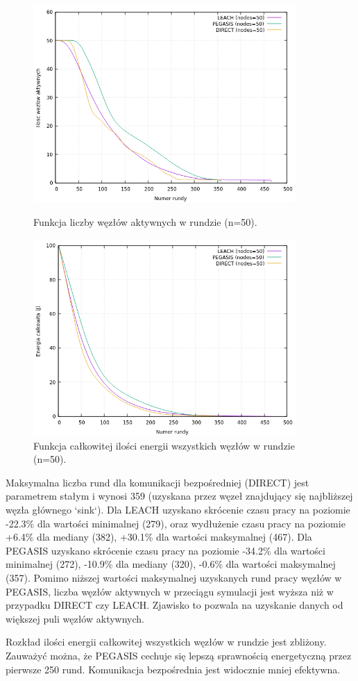 \documentclass[a4paper,12pt,twoside,openany]{report}
\begin{document}
\begin{figure}[H]
 \centering
 \includegraphics[width=10cm]{images/gnuplot/test_2/nodes_in_round_50.png}
 \caption{Funkcja liczby węzłów aktywnych w rundzie (n=50).}
 \includegraphics[width=10cm]{images/gnuplot/test_2/energy_in_round_50.png}
 \caption{Funkcja całkowitej ilości energii wszystkich węzłów w rundzie (n=50).}
\end{figure}

\par
Maksymalna liczba rund dla komunikacji bezpośredniej (DIRECT) jest parametrem stałym i wynosi 359 (uzyskana przez węzeł znajdujący się najbliższej węzła głównego `sink`).
Dla LEACH uzyskano skrócenie czasu pracy na poziomie -22.3\% dla wartości minimalnej (279), oraz wydłużenie czasu pracy na poziomie +6.4\% dla mediany (382), +30.1\% dla wartości maksymalnej (467).
Dla PEGASIS uzyskano skrócenie czasu pracy na poziomie -34.2\% dla wartości minimalnej (272), -10.9\% dla mediany (320), -0.6\% dla wartości maksymalnej (357).
Pomimo niższej wartości maksymalnej uzyskanych rund pracy węzłów w PEGASIS, liczba węzłów aktywnych w przeciągu symulacji jest wyższa niż w przypadku DIRECT czy LEACH.
Zjawisko to pozwala na uzyskanie danych od większej puli węzłów aktywnych.
\par
Rozkład ilości energii całkowitej wszystkich węzłów w rundzie jest zbliżony.
Zauważyć można, że PEGASIS cechuje się lepszą sprawnością energetyczną przez pierwsze 250 rund.  Komunikacja bezpośrednia jest widocznie mniej efektywna.
\end{document}
